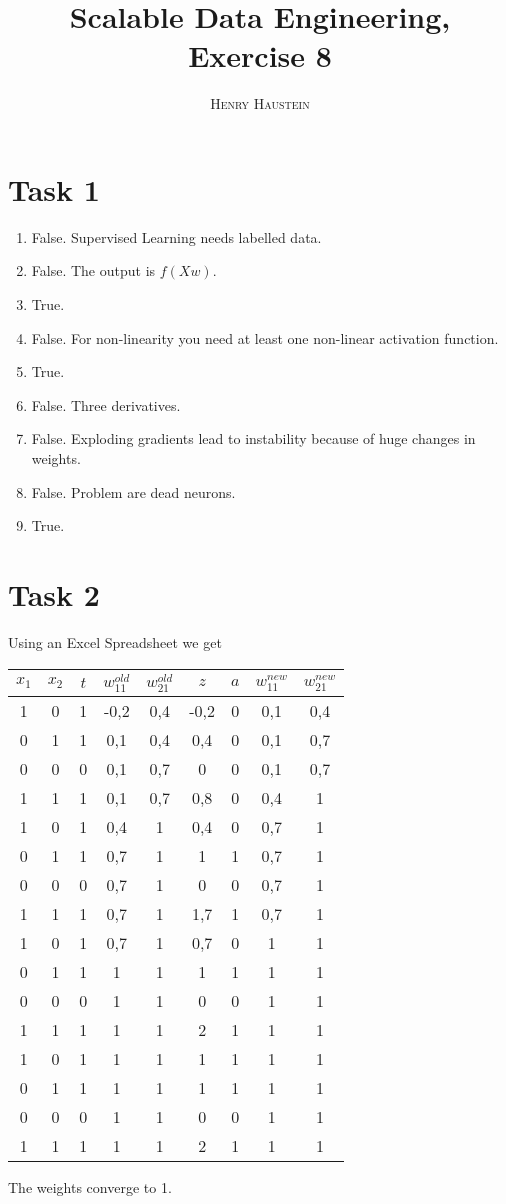 \documentclass{article}
\title{\textbf{Scalable Data Engineering, Exercise 8}}
\author{\textsc{Henry Haustein}}
\date{}
\begin{document}
	\maketitle
	
	\section*{Task 1}
	\begin{enumerate}[label=(\alph*)]
		\item False. Supervised Learning needs labelled data.
		\item False. The output is $f(Xw)$.
		\item True.
		\item False. For non-linearity you need at least one non-linear activation function.
		\item True.
		\item False. Three derivatives.
		\item False. Exploding gradients lead to instability because of huge changes in weights.
		\item False. Problem are dead neurons.
		\item True.
	\end{enumerate}

	\section*{Task 2}
	Using an Excel Spreadsheet we get
	\begin{center}
		\begin{longtable}{ccc|cccc|cc}
			$x_1$ & $x_2$ & $t$ & $w_{11}^{old}$ & $w_{21}^{old}$ & $z$ & $a$ & $w_{11}^{new}$ & $w_{21}^{new}$ \\
			\hline
			1 & 0 & 1 & -0,2 & 0,4 & -0,2 & 0 & 0,1 & 0,4
\\
			0 & 1 & 1 & 0,1 & 0,4 & 0,4 & 0 & 0,1 & 0,7
\\
			0 & 0 & 0 & 0,1 & 0,7 & 0 & 0 & 0,1 & 0,7
\\
			1 & 1 & 1 & 0,1 & 0,7 & 0,8 & 0 & 0,4 & 1
\\
			\hline
			1 & 0 & 1 & 0,4 & 1 & 0,4 & 0 & 0,7 & 1
\\
		 	0 & 1 & 1 & 0,7 & 1 & 1 & 1 & 0,7 & 1
\\
			0 & 0 & 0 & 0,7 & 1 & 0 & 0 & 0,7 & 1
\\
			1 & 1 & 1 & 0,7 & 1 & 1,7 & 1 & 0,7 & 1
\\
			\hline
			1 & 0 & 1 & 0,7 & 1 & 0,7 & 0 & 1 & 1
\\
			0 & 1 & 1 & 1 & 1 & 1 & 1 & 1 & 1
\\
			0 & 0 & 0 & 1 & 1 & 0 & 0 & 1 & 1
\\
			1 & 1 & 1 & 1 & 1 & 2 & 1 & 1 & 1
\\
			\hline
			1 & 0 & 1 & 1 & 1 & 1 & 1 & 1 & 1
\\
			0 & 1 & 1 & 1 & 1 & 1 & 1 & 1 & 1
\\
			0 & 0 & 0 & 1 & 1 & 0 & 0 & 1 & 1
\\
			1 & 1 & 1 & 1 & 1 & 2 & 1 & 1 & 1
		\end{longtable}
	\end{center}
	The weights converge to 1.
\end{document}
